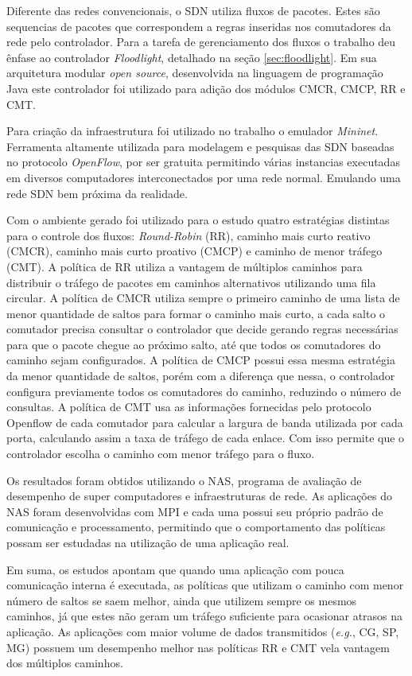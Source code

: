 Diferente das redes convencionais, o SDN utiliza fluxos de pacotes. Estes são sequencias de pacotes que correspondem a regras inseridas nos comutadores da rede pelo controlador. Para a tarefa de gerenciamento dos fluxos o trabalho deu ênfase ao controlador \emph{Floodlight}, detalhado na seção \ref{sec:floodlight}. Em sua arquitetura modular \textit{open source}, desenvolvida na linguagem de programação Java este controlador foi utilizado para adição dos módulos CMCR, CMCP, RR e CMT. 

Para criação da infraestrutura foi utilizado no trabalho o emulador \textit{Mininet}. Ferramenta altamente utilizada para modelagem e pesquisas das SDN baseadas no protocolo \textit{OpenFlow}, por ser gratuita permitindo várias instancias executadas em diversos computadores interconectados por uma rede normal. Emulando uma rede SDN bem próxima da realidade.

Com o ambiente gerado foi utilizado para o estudo quatro estratégias distintas para o controle dos fluxos: \textit{Round-Robin} (RR), caminho mais curto reativo (CMCR), caminho mais curto proativo (CMCP) e caminho de menor tráfego (CMT). A política de RR utiliza a vantagem de múltiplos caminhos para distribuir o tráfego de pacotes em caminhos alternativos utilizando uma fila circular. A política de CMCR utiliza sempre o primeiro caminho de uma lista de menor quantidade de saltos para formar o caminho mais curto, a cada salto o comutador precisa consultar o controlador que decide gerando regras necessárias para que o pacote chegue ao próximo salto, até que todos os comutadores do caminho sejam configurados. A política de CMCP possui essa mesma estratégia da menor quantidade de saltos, porém com a diferença que nessa, o controlador configura previamente todos os comutadores do caminho, reduzindo o número de consultas. A política de CMT usa as informações fornecidas pelo protocolo Openflow de cada comutador para calcular a largura de banda utilizada por cada porta, calculando assim a taxa de tráfego de cada enlace. Com isso permite que o controlador escolha o caminho com menor tráfego para o fluxo.

Os resultados foram obtidos utilizando o NAS, programa de avaliação de desempenho de super computadores e infraestruturas de rede. As aplicações do NAS foram desenvolvidas com MPI e cada uma possui seu próprio padrão de comunicação e processamento, permitindo que o comportamento das políticas possam ser estudadas na utilização de uma aplicação real.

Em suma, os estudos apontam que quando uma aplicação com pouca comunicação interna é executada, as políticas que utilizam o caminho com menor número de saltos se saem melhor, ainda que utilizem sempre os mesmos caminhos, já que estes não geram um tráfego suficiente para ocasionar atrasos na aplicação. As aplicações com maior volume de dados transmitidos (\textit{e.g.}, CG, SP, MG)  possuem um desempenho  melhor nas políticas RR e CMT vela vantagem dos múltiplos caminhos. 


